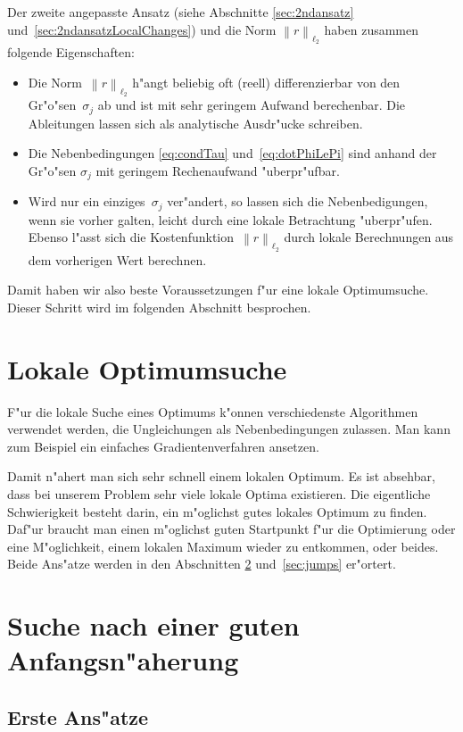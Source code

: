\documentclass[a4paper]{scrartcl}
\newcommand{\norm}[1]{{\left\lVert#1\right\rVert}}
\begin{document}
Der zweite angepasste Ansatz (siehe Abschnitte \ref{sec:2ndansatz} und~\ref{sec:2ndansatzLocalChanges}) und die Norm $\norm{r}_{\ell_2}$ haben zusammen folgende Eigenschaften:

\begin{itemize}
\item Die Norm~$\norm{r}_{\ell_2}$ h"angt beliebig oft (reell) differenzierbar von den Gr"o"sen~$\sigma_j$ ab und ist mit sehr geringem Aufwand berechenbar. Die Ableitungen lassen sich als analytische Ausdr"ucke schreiben.
\item Die Nebenbedingungen \eqref{eq:condTau} und~\eqref{eq:dotPhiLePi} sind anhand der Gr"o"sen $\sigma_j$ mit geringem Rechenaufwand "uberpr"ufbar. 
\item Wird nur ein einziges~$\sigma_j$ ver"andert, so lassen sich die Nebenbedigungen, wenn sie vorher galten, leicht durch eine lokale Betrachtung "uberpr"ufen. Ebenso l"asst sich die Kostenfunktion~$\norm{r}_{\ell_2}$ durch lokale Berechnungen aus dem vorherigen Wert berechnen. 
\end{itemize}
Damit haben wir also beste Voraussetzungen f"ur eine lokale Optimumsuche. Dieser Schritt wird im folgenden Abschnitt besprochen. 


\section{Lokale Optimumsuche} \label{sec:gradients}

F"ur die lokale Suche eines Optimums k"onnen verschiedenste Algorithmen verwendet werden, die Ungleichungen als Nebenbedingungen zulassen. Man kann zum Beispiel ein einfaches Gradientenverfahren ansetzen. 

Damit n"ahert man sich sehr schnell einem lokalen Optimum. Es ist absehbar, dass bei unserem Problem sehr viele lokale Optima existieren. Die eigentliche Schwierigkeit besteht darin, ein m"oglichst gutes lokales Optimum zu finden. Daf"ur braucht man einen m"oglichst guten Startpunkt f"ur die Optimierung oder eine M"oglichkeit, einem lokalen Maximum wieder zu entkommen, oder beides. Beide Ans"atze werden in den Abschnitten \ref{sec:initialval} und~\ref{sec:jumps} er"ortert. 


\section{Suche nach einer guten Anfangsn"aherung} \label{sec:initialval}

\subsection{Erste Ans"atze}
\end{document}
